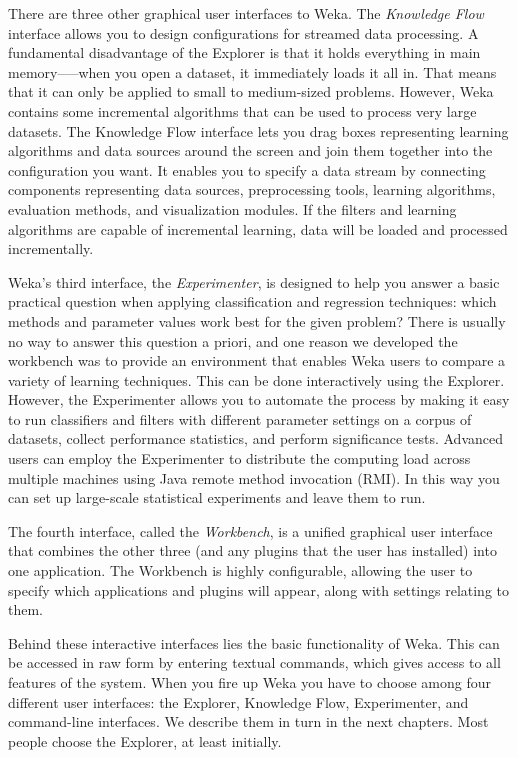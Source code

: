 There are three other graphical user interfaces to
Weka. The \textit{Knowledge Flow} interface allows you to design
configurations for streamed data processing. A fundamental
disadvantage of the Explorer is that it holds everything in main
memory—--when you open a dataset, it immediately loads it all in. That
means that it can only be applied to small to medium-sized
problems. However, Weka contains some incremental algorithms that can
be used to process very large datasets. The Knowledge Flow interface
lets you drag boxes representing learning algorithms and data sources
around the screen and join them together into the configuration you
want. It enables you to specify a data stream by connecting components
representing data sources, preprocessing tools, learning algorithms,
evaluation methods, and visualization modules. If the filters and
learning algorithms are capable of incremental learning, data will be
loaded and processed incrementally.

Weka’s third interface, the \textit{Experimenter}, is designed to help
you answer a basic practical question when applying classification and
regression techniques: which methods and parameter values work best
for the given problem? There is usually no way to answer this question
a priori, and one reason we developed the workbench was to provide an
environment that enables Weka users to compare a variety of learning
techniques. This can be done interactively using the
Explorer. However, the Experimenter allows you to automate the process
by making it easy to run classifiers and filters with different
parameter settings on a corpus of datasets, collect performance
statistics, and perform significance tests. Advanced users can employ
the Experimenter to distribute the computing load across multiple
machines using Java remote method invocation (RMI). In this way you
can set up large-scale statistical experiments and leave them to run.

The fourth interface, called the \textit{Workbench}, is a unified
graphical user interface that combines the other three (and any
plugins that the user has installed) into one application. The
Workbench is highly configurable, allowing the user to specify which
applications and plugins will appear, along with settings relating to
them.

Behind these interactive interfaces lies the basic functionality of
Weka. This can be accessed in raw form by entering textual commands,
which gives access to all features of the system. When you fire up
Weka you have to choose among four different user interfaces: the
Explorer, Knowledge Flow, Experimenter, and command-line
interfaces. We describe them in turn in the next chapters. Most people
choose the Explorer, at least initially.

